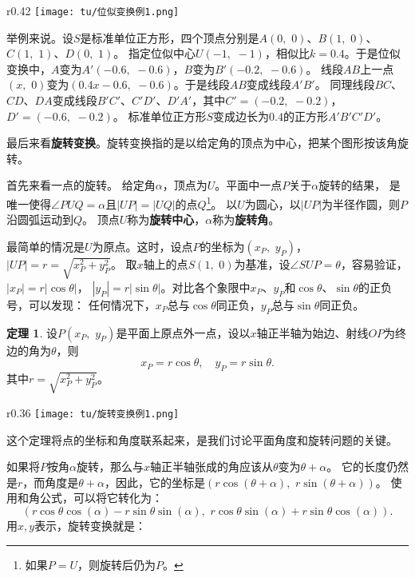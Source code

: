 \documentclass[12pt,UTF8]{ctexbook}
\theoremstyle{definition}
\newtheorem{tm}{定理}[section]
\theoremstyle{plain}
\begin{document}
\begin{wrapfigure}[9]{r}{0.42\textwidth} %
    \vspace{-25pt}
    \flushright
    \texttt{[image: tu/位似变换例1.png]}
\end{wrapfigure}

举例来说。设$S$是标准单位正方形，四个顶点分别是$A(0,\,\,0)$、$B(1,\,\,0)$、$C(1,\,\,1)$、$D(0,\,\,1)$。
指定位似中心$U(-1,\,\,-1)$，相似比$k=0.4$。于是位似变换中，$A$变为$A'(-0.6,\,\,-0.6)$，$B$变为$B'(-0.2,\,\,-0.6)$。
线段$AB$上一点$(x,\,\,0)$变为$(0.4x - 0.6, \,\, -0.6)$。于是线段$AB$变成线段$A'B'$。
同理线段$BC$、$CD$、$DA$变成线段$B'C'$、$C'D'$、$D'A'$，其中$C'=(-0.2,\,\, -0.2)$，$D'=(-0.6,\,\,-0.2)$。
标准单位正方形$S$变成边长为$0.4$的正方形$A'B'C'D'$。

最后来看\textbf{旋转变换}。旋转变换指的是以给定角的顶点为中心，把某个图形按该角旋转。

首先来看一点的旋转。
给定角$\alpha$，顶点为$U$。平面中一点$P$关于$\alpha$旋转的结果，
是唯一使得$\angle PUQ = \alpha$且$|UP| = |UQ|$的点$Q$\footnote{如果$P=U$，则旋转后仍为$P$。}。
以$U$为圆心，以$|UP|$为半径作圆，则$P$沿圆弧运动到$Q$。
顶点$U$称为\textbf{旋转中心}，$\alpha$称为\textbf{旋转角}。

最简单的情况是$U$为原点。这时，设点$P$的坐标为$(x_P,\,\,y_P)$，$|UP| = r = \sqrt{x_P^2 + y_P^2}$。
取$x$轴上的点$S(1,\,\,0)$为基准，设$\angle SUP = \theta$，容易验证，$|x_P| = r|\cos{\theta}|$，
$|y_P| = r|\sin{\theta}|$。对比各个象限中$x_P$、$y_P$和$\cos{\theta}$、$\sin{\theta}$的正负号，可以发现：
任何情况下，$x_P$总与$\cos{\theta}$同正负，$y_P$总与$\sin{\theta}$同正负。

\begin{tm}
    设$P(x_P,\,\,y_P)$是平面上原点外一点，设以$x$轴正半轴为始边、射线$OP$为终边的角为$\theta$，则
    $$ x_P = r\cos{\theta},\quad y_P = r\sin{\theta}.$$
    其中$r = \sqrt{x_P^2 + y_P^2}$。
\end{tm}

\begin{wrapfigure}[7]{r}{0.36\textwidth} %
    \vspace{-40pt}
    \flushright
    \texttt{[image: tu/旋转变换例1.png]}
\end{wrapfigure}

这个定理将点的坐标和角度联系起来，是我们讨论平面角度和旋转问题的关键。 

如果将$P$按角$\alpha$旋转，那么与$x$轴正半轴张成的角应该从$\theta$变为$\theta + \alpha$。
它的长度仍然是$r$，而角度是$\theta + \alpha$，因此，它的坐标是$\left(r\cos{(\theta + \alpha)},\,\,r\sin{(\theta + \alpha)}\right)$。
使用和角公式，可以将它转化为：
$$\left(r\cos{\theta}\cos{(\alpha)} - r\sin{\theta}\sin{(\alpha)},\,\,r\cos{\theta}\sin{(\alpha)} + r\sin{\theta}\cos{(\alpha)}\right).$$
用$x,y$表示，旋转变换就是：
\end{document}
